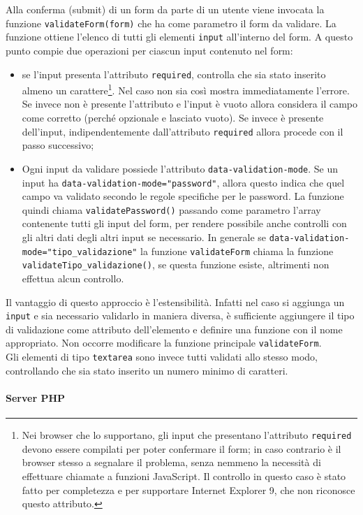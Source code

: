 \documentclass[12pt]{article}
\newcommand{\code}[1]{\texttt{#1}}
\begin{document}
	Alla conferma (submit) di un form da parte di un utente viene invocata la funzione \code{validateForm(form)} che ha come parametro il form da validare. La funzione ottiene l'elenco di tutti gli elementi \code{input} all'interno del form.
	A questo punto compie due operazioni per ciascun input contenuto nel form:
	\begin{itemize}
		\item se l'input presenta l'attributo \code{required}, controlla che sia stato inserito almeno un carattere\footnote{Nei browser che lo supportano, gli input che presentano l'attributo \code{required} devono essere compilati per poter confermare il form; in caso contrario è il browser stesso a segnalare il problema, senza nemmeno la necessità di effettuare chiamate a funzioni JavaScript. Il controllo in questo caso è stato fatto per completezza e per supportare Internet Explorer 9, che non riconosce questo attributo.}. Nel caso non sia così mostra immediatamente l'errore. Se invece non è presente l'attributo e l'input è vuoto allora considera il campo come corretto (perché opzionale e lasciato vuoto). Se invece è presente dell'input, indipendentemente dall'attributo \code{required} allora procede con il passo successivo;
		\item Ogni input da validare possiede l'attributo 	\code{data-validation-mode}. Se un input ha \code{data-validation-mode="password"}, allora questo indica che quel campo va validato secondo le regole specifiche per le password. La funzione quindi chiama \code{validatePassword()} passando come parametro l'array contenente tutti gli input del form, per rendere possibile anche controlli con gli altri dati degli altri input se necessario. In generale se \code{data-validation-mode="tipo\_validazione"} la funzione \code{validateForm} chiama la funzione \code{validateTipo\_validazione()}, se questa funzione esiste, altrimenti non effettua alcun controllo.
	\end{itemize}
	Il vantaggio di questo approccio è l'estensibilità. Infatti nel caso si aggiunga un \code{input} e sia necessario validarlo in maniera diversa, è sufficiente aggiungere il tipo di validazione come attributo dell'elemento e definire una funzione con il nome appropriato. Non occorre modificare la funzione principale \code{validateForm}.\\
	Gli elementi di tipo \code{textarea} sono invece tutti validati allo stesso modo, controllando che sia stato inserito un numero minimo di caratteri.
	
	\paragraph{Server PHP}
	
\end{document}
